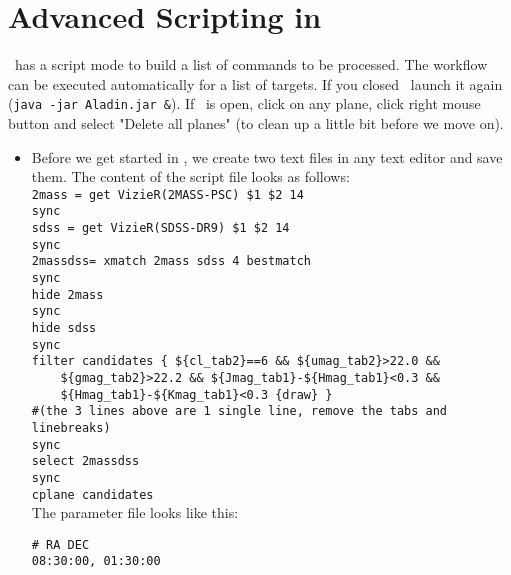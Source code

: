 \documentclass [a4paper, 12pt]{article}
\begin{document}
\section{Advanced Scripting in \aladin}
\aladin\ has a script mode to build a list of commands to be processed. The
workflow can be executed automatically for a list of targets. If you closed
\aladin\, launch it again (\texttt{java -jar Aladin.jar \&}). If \aladin\
is open, click on any plane, click right mouse button and select "Delete all
planes" (to clean up a little bit before we move on).
\newpage
\begin{itemize}

\item Before we get started in \aladin, we create two text files in any text
editor and save them. The content of the script file looks as follows:\\

\texttt{2mass = get VizieR(2MASS-PSC) \$1 \$2 14\textquotesingle}\\
\texttt{sync}\\
\texttt{sdss = get VizieR(SDSS-DR9) \$1 \$2 14\textquotesingle}\\
\verb|sync|\\
\verb|2massdss= xmatch 2mass sdss 4 bestmatch|\\
\verb|sync|\\
\verb|hide 2mass|\\
\verb|sync|\\
\verb|hide sdss|\\
\verb|sync|\\
\verb|filter candidates { ${cl_tab2}==6 && ${umag_tab2}>22.0 && |\\
\verb|    ${gmag_tab2}>22.2 && ${Jmag_tab1}-${Hmag_tab1}<0.3 &&|\\
\verb|    ${Hmag_tab1}-${Kmag_tab1}<0.3 {draw} }|\\
\verb|#(the 3 lines above are 1 single line, remove the tabs and linebreaks)|\\
\verb|sync|\\
\verb|select 2massdss|\\
\verb|sync|\\
\verb|cplane candidates|\\

The parameter file looks like this:
\begin{verbatim}
# RA DEC
08:30:00, 01:30:00
\end{verbatim}


\end{itemize}
\end{document}
